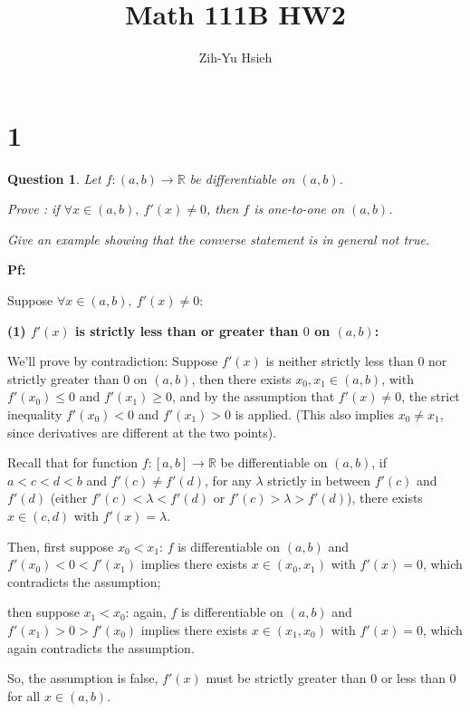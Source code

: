 \documentclass{article}
\title{Math 111B HW2}
\author{Zih-Yu Hsieh}
\newtheorem{question}{Question}
\begin{document}
\maketitle

\section*{1}
\begin{question}
    Let $f : (a, b) \rightarrow \mathbb{R}$ be differentiable on $(a, b)$.
    
    Prove : if $\forall x\in(a,b),\ f'(x)\neq 0$, then $f$ is one-to-one on $(a, b)$.
    
    Give an example showing that the converse statement is in general not true.
\end{question}

\textbf{Pf:}

Suppose $\forall x\in(a,b),\ f'(x)\neq 0$:

\hfill

\textbf{(1) $f'(x)$ is strictly less than or greater than $0$ on $(a,b)$:}

We'll prove by contradiction: Suppose $f'(x)$ is neither strictly less than $0$ nor strictly greater than $0$ on $(a,b)$,
then there exists $x_0, x_1\in (a,b)$, with $f'(x_0)\leq 0$ and $f'(x_1)\geq 0$, and by the assumption that $f'(x)\neq 0$,
the strict inequality $f'(x_0)< 0$ and $f'(x_1)> 0$ is applied. (This also implies $x_0 \neq x_1$, since derivatives are different
 at the two points).

\hfill

Recall that for function $f:[a,b]\rightarrow \mathbb{R}$ be differentiable on $(a,b)$, if $a<c<d<b$ and 
$f'(c)\neq f'(d)$, for any $\lambda$ strictly in between $f'(c)$ and $f'(d)$ (either $f'(c)<\lambda<f'(d)$ or $f'(c)>\lambda>f'(d)$),
there exists $x\in (c,d)$ with $f'(x)=\lambda$.

Then, first suppose $x_0<x_1$: $f$ is differentiable on $(a,b)$ and $f'(x_0) < 0 < f'(x_1)$ implies there exists $x\in(x_0,x_1)$ with
$f'(x)=0$, which contradicts the assumption;

then suppose $x_1<x_0$: again, $f$ is differentiable on $(a,b)$ and $f'(x_1)>0>f'(x_0)$ implies there exists $x\in (x_1,x_0)$ with
$f'(x)=0$, which again contradicts the assumption.

So, the assumption is false, $f'(x)$ must be strictly greater than $0$ or less than $0$ for all $x\in (a,b)$.

\hfill
\end{document}
